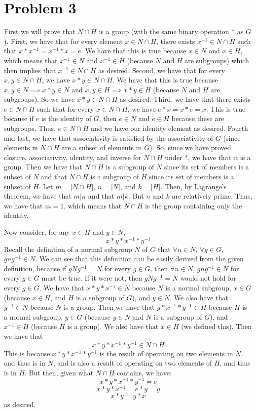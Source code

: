 \documentclass{article}
\begin{document}
\section*{Problem 3}
First we will prove that $N \cap H$ is a group (with the same binary operation
$*$ as $G$). First, we have that for every element $x \in N \cap H$, there exists
$x^{-1} \in N \cap H$ such that $x * x^{-1} = x^{-1} * x = e$. We have that this
is true because $x \in N$ and $x \in H$, which means that $x^{-1} \in N$
and $x^{-1} \in H$ (because $N$ and $H$ are subgroups) which then implies that
$x^{-1} \in N \cap H$ as desired. Second, we have that for every $x,y \in
N \cap H$, we have $x * y \in N \cap H$. We have that this is true because
$x, y \in N \implies x * y \in N$ and $x, y \in H \implies x * y \in H$ (because
$N$ and $H$ are subgroups). So we have $x * y \in N \cap H$ as desired. Third,
we have that there exists $e \in N \cap H$ such that for every $x \in N \cap H$,
we have $e * x = x * e = x$. This is true because if $e$ is the identity of $G$,
then $e \in N$ and $e \in H$ because these are subgroups. Thus, $e \in N \cap H$
and we have our identity element as desired. Fourth and last, we have that
associativity is satisfied by the associativity of $G$ (since elements in
$N \cap H$ are a subset of elements in $G$). So, since we have proved
closure, associativity, identity, and inverse for $N \cap H$ under $*$, we have
that it is a group. Then we have that $N \cap H$ is a subgroup of $N$ since
its set of members is a subset of $N$ and that $N \cap H$ is a subgroup of
$H$ since its set of members is a subset of $H$. Let $m = |N \cap H|$, $n = |N|$,
and $k = |H|$. Then, by Lagrange's theorem, we have that $m | n$ and that
$m | k$. But $n$ and $k$ are relatively prime. Thus, we have that $m = 1$, which
means that $N \cap H$ is the group containing only the identity.

Now consider, for any $x \in H$ and $y \in N$,
\[ x * y * x^{-1} * y^{-1} \]
Recall the definition of a normal subgroup $N$ of $G$ that
$\forall n \in N$, $\forall g \in G$, $gng^{-1} \in N$. We can see that this
definition can be easily derived from the given definition, because
if $gNg^{-1} = N$ for every $g \in G$, then $\forall n \in N$,
$gng^{-1} \in N$ for every $g \in G$ must be true. If it were not, then
$gNg^{-1} = N$ would not hold for every $g \in G$.
We have that $x * y * x^{-1} \in N$ because $N$ is a normal subgroup,
$x \in G$ (because $x \in H$, and $H$ is a subgroup of $G$), and $y \in N$.
We also have that $y^{-1} \in N$ because $N$ is a
group. Then we have that $y * x^{-1} * y^{-1} \in H$ because $H$ is a normal
subgroup, $y \in G$ (because $y \in N$ and $N$ is a subgroup of $G$),
and $x^{-1} \in H$ (because $H$ is a group). We also
have that $x \in H$ (we defined this). Then we have that
\[ x * y * x^{-1} * y^{-1} \in N \cap H \]
This is because $x * y * x^{-1} * y^{-1}$ is the result of operating on
two elements in $N$, and thus is in $N$, and is also a result of operating on
two elements of $H$, and thus is in $H$.
But then, given what $N \cap H$ contains, we have:
\[ x * y * x^{-1} * y^{-1} = e \]
\[ x * y * x^{-1} = e * y = y \]
\[ x * y = y * x \]
as desired.
\end{document}
